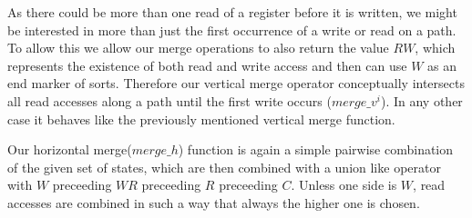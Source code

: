 As there could be more than one read of a register before it is written, we might be interested in more than just the first occurrence of a write or read on a path. 
To allow this we allow our merge operations to also return the value $RW$, which represents the existence of both read and write access and then can use $W$ as an end 
marker of sorts.
Therefore our vertical merge operator conceptually intersects all read accesses along a path until the first write 
occurs ($merge\_v^{i}$). In any other case it behaves like the previously mentioned vertical merge function.


Our horizontal merge($merge\_h$) function is again a simple pairwise combination of the given set of states, which are then combined with a union 
like operator with $W$ preceeding $WR$ preceeding $R$ preceeding $C$. Unless one side is $W$, read accesses are combined in such a way that always the higher one is chosen.


